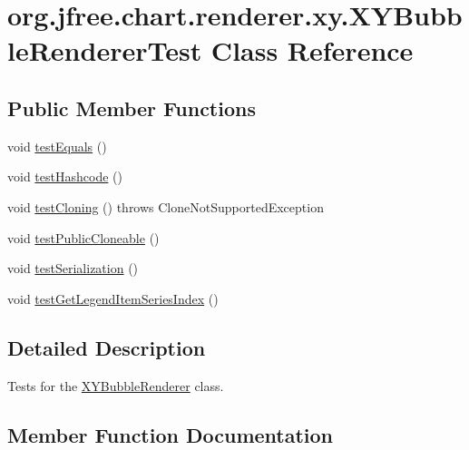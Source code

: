 \hypertarget{classorg_1_1jfree_1_1chart_1_1renderer_1_1xy_1_1_x_y_bubble_renderer_test}{}\section{org.\+jfree.\+chart.\+renderer.\+xy.\+X\+Y\+Bubble\+Renderer\+Test Class Reference}
\label{classorg_1_1jfree_1_1chart_1_1renderer_1_1xy_1_1_x_y_bubble_renderer_test}
\subsection*{Public Member Functions}
\begin{DoxyCompactItemize}
\item 
void \mbox{\hyperlink{classorg_1_1jfree_1_1chart_1_1renderer_1_1xy_1_1_x_y_bubble_renderer_test_adab3cfbef1b5f1168f0d70099710e8d1}{test\+Equals}} ()
\item 
void \mbox{\hyperlink{classorg_1_1jfree_1_1chart_1_1renderer_1_1xy_1_1_x_y_bubble_renderer_test_a386e1969f3971f252eee0fe751a8f959}{test\+Hashcode}} ()
\item 
void \mbox{\hyperlink{classorg_1_1jfree_1_1chart_1_1renderer_1_1xy_1_1_x_y_bubble_renderer_test_aca547ecdff63961bf21173577e7cbd23}{test\+Cloning}} ()  throws Clone\+Not\+Supported\+Exception 
\item 
void \mbox{\hyperlink{classorg_1_1jfree_1_1chart_1_1renderer_1_1xy_1_1_x_y_bubble_renderer_test_afee8ed0bd25879697e27e3d75d9cc79c}{test\+Public\+Cloneable}} ()
\item 
void \mbox{\hyperlink{classorg_1_1jfree_1_1chart_1_1renderer_1_1xy_1_1_x_y_bubble_renderer_test_a7e92ecfe144f495b1e0e8f4339873106}{test\+Serialization}} ()
\item 
void \mbox{\hyperlink{classorg_1_1jfree_1_1chart_1_1renderer_1_1xy_1_1_x_y_bubble_renderer_test_ae44605f524e677a8f7a0f9c4f18fd250}{test\+Get\+Legend\+Item\+Series\+Index}} ()
\end{DoxyCompactItemize}


\subsection{Detailed Description}
Tests for the \mbox{\hyperlink{classorg_1_1jfree_1_1chart_1_1renderer_1_1xy_1_1_x_y_bubble_renderer}{X\+Y\+Bubble\+Renderer}} class. 

\subsection{Member Function Documentation}
\mbox{\label{classorg_1_1jfree_1_1chart_1_1renderer_1_1xy_1_1_x_y_bubble_renderer_test_aca547ecdff63961bf21173577e7cbd23}} 
